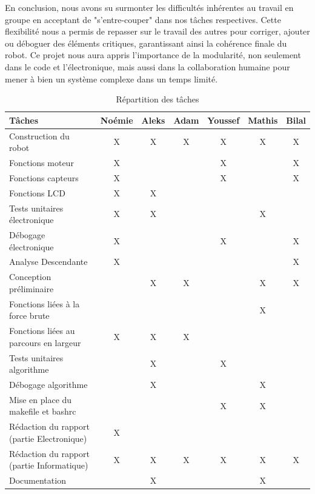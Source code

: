 En conclusion, nous avons su surmonter les difficultés inhérentes au travail en groupe en acceptant de "s'entre-couper" dans nos tâches respectives. Cette flexibilité nous a permis de repasser sur le travail des autres pour corriger, ajouter ou déboguer des éléments critiques, garantissant ainsi la cohérence finale du robot. Ce projet nous aura appris l'importance de la modularité, non seulement dans le code et l'électronique, mais aussi dans la collaboration humaine pour mener à bien un système complexe dans un temps limité.

\begin{table}[h]
\centering
\small %
\setlength{\tabcolsep}{3pt} %
\renewcommand{\arraystretch}{1.5}
\begin{tabular}{|l|*{6}{c|}}
\hline
\textbf{Tâches} & \textbf{Noémie} & \textbf{Aleks} & \textbf{Adam} & \textbf{Youssef} & \textbf{Mathis} & \textbf{Bilal} \\ \hline
Construction du robot & X & X & X & X & X & X \\ \hline
Fonctions moteur & X &  &  & X &  &X \\ \hline
Fonctions capteurs & X &  & & X &  & X \\ \hline
Fonctions LCD & X & X &  &  &  & \\ \hline
Tests unitaires électronique & X & X & & & X & \\ \hline
Débogage électronique & X &  &  & X &  & X \\ \hline
Analyse Descendante & X & & & &  & X\\ \hline
Conception préliminaire &  & X & X & & X & X \\ \hline
Fonctions liées à la force brute &  & & & & X & \\ \hline
Fonctions liées au parcours en largeur & X & X & X & & &  \\ \hline
Tests unitaires algorithme &  & X  & & X & &  \\ \hline
Débogage algorithme &  & X & & & X &  \\ \hline
Mise en place du makefile et bashrc & & & & X & X &  \\ \hline
Rédaction du rapport (partie Electronique) & X &  &  &  &  &  \\ \hline
Rédaction du rapport (partie Informatique) & X & X & X & X & X & X \\ \hline
Documentation &  & X &  &  & X &  \\ \hline
\end{tabular}
\caption{Répartition des tâches}
\label{tab:repartition_taches}
\end{table}


